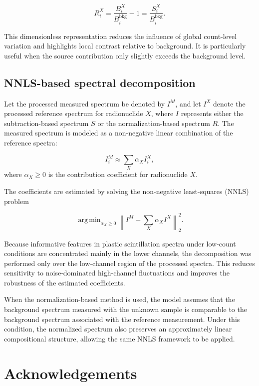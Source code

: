\documentclass[fleqn, 10pt]{wlscirep}
\DeclareMathOperator*{\argmin}{arg\,min} %
\begin{document}
\begin{equation}
R^X_i = \dfrac{B_i^X}{B_i^\text{bkg}} -1 = \dfrac{S_i^X}{B_i^\text{bkg}}.
\end{equation}

This dimensionless representation reduces the influence of global count-level variation and highlights local contrast relative to background. It is particularly useful when the source contribution only slightly exceeds the background level.

\subsection*{NNLS-based spectral decomposition}

Let the processed measured spectrum be denoted by $I^M$, and let $I^X$ denote the processed reference spectrum for radionuclide $X$, where $I$ represents either the subtraction-based spectrum $S$ or the normalization-based spectrum $R$. The measured spectrum is modeled as a non-negative linear combination of the reference spectra:

\begin{equation}
I^M_i \approx \sum_X \alpha_X I_i^X,
\end{equation}
where $\alpha_X \ge 0$ is the contribution coefficient for radionuclide $X$.

The coefficients are estimated by solving the non-negative least-squares (NNLS) problem

\begin{equation}
\argmin_{\alpha_X \ge 0} \left\| I^M - \sum_X \alpha_X I^X \right\|^2_2.
\end{equation}

Because informative features in plastic scintillation spectra under low-count conditions are concentrated mainly in the lower channels, the decomposition was performed only over the low-channel region of the processed spectra. This reduces sensitivity to noise-dominated high-channel fluctuations and improves the robustness of the estimated coefficients. 

When the normalization-based method is used, the model assumes that the background spectrum measured with the unknown sample is comparable to the background spectrum associated with the reference measurement. Under this condition, the normalized spectrum also preserves an approximately linear compositional structure, allowing the same NNLS framework to be applied.

\section*{Acknowledgements}
\end{document}
